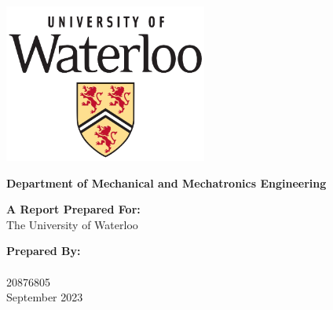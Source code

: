 \thispagestyle{empty}
\begin{center}
    \textbf{\reportTitle}
\end{center}
\vspace{1cm}
\begin{center}
    \begin{center}
        \includegraphics[width=0.5\textwidth]{content/images/uw-icon.png}
    \end{center}
    \textbf{Department of Mechanical and Mechatronics Engineering}
\end{center}




\vspace*{\fill}
    \begin{center}
        \textbf{A Report Prepared For:}\\
        The University of Waterloo
    \end{center}
\vspace*{\fill}

\begin{center}
    \textbf{Prepared By:}\\
    \name \\
    20876805\\
    September 2023
\end{center}

\newpage